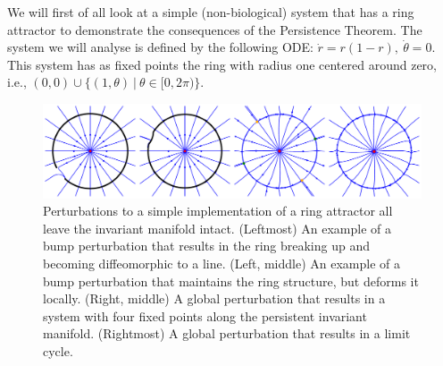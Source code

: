\documentclass{article}
\newcounter{ct}
\theoremstyle{definition}
\theoremstyle{remark}
\begin{document}




We will first of all look at a simple (non-biological) system that has a ring attractor to demonstrate the consequences of the Persistence Theorem.
The system we will analyse is defined by the following ODE: $\dot r = r(1-r), \ \dot \theta = 0.$
This system has as fixed points the ring with radius one centered around zero, i.e., $(0,0)\cup\{(1,\theta)\ |\ \theta\in[0,2\pi)\}$.




\begin{figure}[H]
     \centering
  \includegraphics[width=.8\textwidth]{figures/ring_perturbations_stream}
       \caption{Perturbations to a simple implementation of a ring attractor all leave the invariant manifold intact. %
              (Leftmost) An example of a bump perturbation that results in the ring breaking up and becoming diffeomorphic to a line. %
              (Left, middle) An example of a bump perturbation that maintains the ring structure, but deforms it locally.
       (Right, middle) A global perturbation that results in a system with four fixed points along the persistent invariant manifold. %
       (Rightmost)   A global perturbation that results in a limit cycle.}
         \label{fig:ring_activity_pert}
\end{figure}
\end{document}
